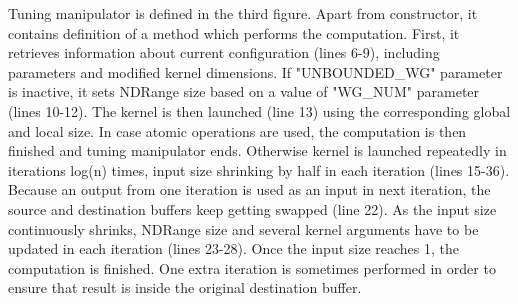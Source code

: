 \documentclass
[
    digital, %
    oneside, %
    table, %
    nolof, %
    nolot, %
    nocover %
]{fithesis3}
\begin{document}
Tuning manipulator is defined in the third figure. Apart from constructor, it contains definition of a method which performs the computation. First,
it retrieves information about current configuration (lines 6-9), including parameters and modified kernel dimensions. If "UNBOUNDED\_WG" parameter
is inactive, it sets NDRange size based on a value of "WG\_NUM" parameter (lines 10-12). The kernel is then launched (line 13) using the corresponding
global and local size. In case atomic operations are used, the computation is then finished and tuning manipulator ends. Otherwise kernel is launched
repeatedly in iterations log(n) times, input size shrinking by half in each iteration (lines 15-36). Because an output from one iteration is used as
an input in next iteration, the source and destination buffers keep getting swapped (line 22). As the input size continuously shrinks, NDRange size
and several kernel arguments have to be updated in each iteration (lines 23-28). Once the input size reaches 1, the computation is finished. One extra
iteration is sometimes performed in order to ensure that result is inside the original destination buffer.
\end{document}

